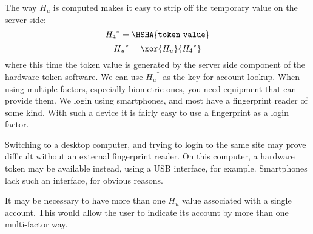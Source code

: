 The way \(H_u\) is computed makes it easy to strip off the temporary value on the server side:
\[{H_4}^{*} = \HSHA{\mathtt{token\ value}}\]
\[{H_u}^{*} = \xor{H_u}{{H_4}^{*}}\]
where this time the token value is generated by the server side component of the hardware token software.
We can use \({H_u}^{*}\) as the key for account lookup.
When using multiple factors, especially biometric ones, you need equipment that can provide them.
We login using smartphones, and most have a fingerprint reader of some kind.
With such a device it is fairly easy to use a fingerprint as a login factor.
\par
Switching to a desktop computer, and trying to login to the same site may prove difficult without an external fingerprint reader.
On this computer, a hardware token may be available instead, using a USB interface, for example.
Smartphones lack such an interface, for obvious reasons.
\par
It may be necessary to have more than one \(H_u\) value associated with a single account.
This would allow the user to indicate its account by more than one multi-factor way.

